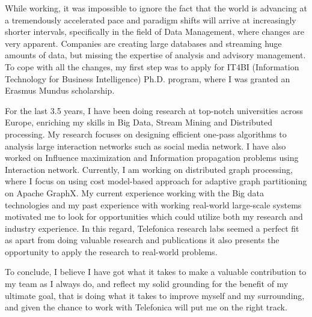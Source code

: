 While working, it was impossible to ignore the fact that the world is advancing at a tremendously accelerated pace and paradigm shifts will arrive at increasingly shorter intervals, specifically in the field of Data Management, where changes are very apparent. Companies are creating large databases and streaming huge amounts of data, but missing the expertise of analysis and advisory management. To
cope with all the changes, my first step was to apply for IT4BI (Information Technology for Business Intelligence) Ph.D. program, where I was granted an Erasmus Mundus scholarship.

For the last 3.5 years, I have been doing research at top-notch universities across Europe, enriching my skills in Big Data, Stream Mining and Distributed processing. My research focuses on designing efficient one-pass algorithms to analysis large interaction networks such as social media network. I have also worked on Influence maximization and Information propagation problems using Interaction network. Currently, I am working on distributed graph processing, where I focus on using cost model-based approach for adaptive graph partitioning on Apache GraphX. My current experience working with the Big data technologies and my past experience with working real-world large-scale systems motivated me to look for opportunities which could utilize both my research and industry experience. In this regard, Telefonica research labs seemed a perfect fit as apart from doing valuable research and publications it also presents the opportunity to apply the research to real-world problems.

To conclude, I believe I have got what it takes to make a valuable contribution to my team as I always do, and reflect my solid grounding for the benefit of my ultimate goal, that is doing what it takes to improve myself and my surrounding, and given the chance to work with Telefonica will put me on the right track.